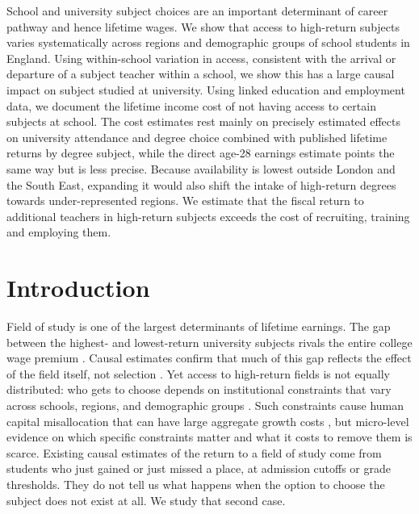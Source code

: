 \begin{chapterabstract}
School and university subject choices are an important determinant of career pathway and hence lifetime wages. We show that access to high-return subjects varies systematically across regions and demographic groups of school students in England. Using within-school variation in access, consistent with the arrival or departure of a subject teacher within a school, we show this has a large causal impact on subject studied at university. Using linked education and employment data, we document the lifetime income cost of not having access to certain subjects at school. The cost estimates rest mainly on precisely estimated effects on university attendance and degree choice combined with published lifetime returns by degree subject, while the direct age-28 earnings estimate points the same way but is less precise. Because availability is lowest outside London and the South East, expanding it would also shift the intake of high-return degrees towards under-represented regions. We estimate that the fiscal return to additional teachers in high-return subjects exceeds the cost of recruiting, training and employing them.
\end{chapterabstract}

\section{Introduction}
\label{sec:Introduction}

Field of study is one of the largest determinants of lifetime earnings. The gap between the highest- and lowest-return university subjects rivals the entire college wage premium \citep{altonji2016handbook}. Causal estimates confirm that much of this gap reflects the effect of the field itself, not selection \citep{kirkeboen2016field,bleemer2022college}. Yet access to high-return fields is not equally distributed: who gets to choose depends on institutional constraints that vary across schools, regions, and demographic groups \citep[e.g.][]{goodman2019math}. Such constraints cause human capital misallocation that can have large aggregate growth costs \citep{hsieh2019allocation}, but micro-level evidence on which specific constraints matter and what it costs to remove them is scarce. Existing causal estimates of the return to a field of study come from students who just gained or just missed a place, at admission cutoffs or grade thresholds. They do not tell us what happens when the option to choose the subject does not exist at all. We study that second case.

